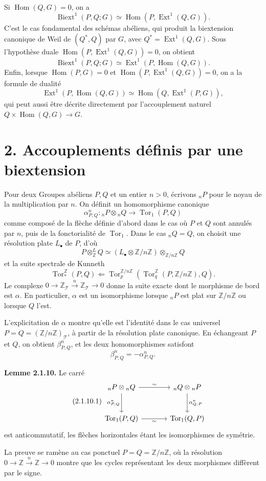 \documentclass[11pt]{article}
\providecommand{\Hom}{\operatorname{Hom}}
\providecommand{\Ext}{\operatorname{Ext}}
\providecommand{\Biext}{\operatorname{Biext}}
\providecommand{\Ext}{\operatorname{Ext}}
\providecommand{\Torop}{\operatorname{Tor}}
\providecommand{\cT}{\mathcal T}
\begin{document}
Si \(\Hom(Q,G)=0\), on a
\[
        \Biext^1(P,Q;G)\simeq\Hom(P,\Ext^1(Q,G)).
\]
C'est le cas fondamental des schémas abéliens, qui produit la biextension canonique de Weil de \((Q^*,Q)\) par \(G\), avec \(Q^*=\Ext^1(Q,G)\).  Sous l'hypothèse duale \(\Hom(P,\Ext^1(Q,G))=0\), on obtient
\[
        \Biext^1(P,Q;G)\simeq \Ext^1(P,\Hom(Q,G)).
\]
Enfin, lorsque \(\Hom(P,G)=0\) et \(\Hom(P,\Ext^1(Q,G))=0\), on a la formule de dualité
\[
        \Ext^1(P,\Hom(Q,G))\simeq\Hom(Q,\Ext^1(P,G)),
\]
qui peut aussi être décrite directement par l'accouplement naturel \(Q\times\Hom(Q,G)\to G\).

\section*{2. Accouplements définis par une biextension}

Pour deux Groupes abéliens \(P,Q\) et un entier \(n>0\), écrivons \({}_nP\) pour le noyau de la multiplication par \(n\).  On définit un homomorphisme canonique
\[
        \alpha^n_{P,Q}:{}_nP\otimes{}_nQ\to\Torop_1(P,Q)
\]
comme composé de la flèche définie d'abord dans le cas où \(P\) et \(Q\) sont annulés par \(n\), puis de la fonctorialité de \(\Torop_1\).  Dans le cas \({}_nQ=Q\), on choisit une résolution plate \(L_\bullet\) de \(P\), d'où
\[
        P\otimes^L_{\mathbb Z}Q\simeq
        (L_\bullet\otimes\mathbb Z/n\mathbb Z)\otimes_{\mathbb Z/n\mathbb Z}Q
\]
et la suite spectrale de Kunneth
\[
        \Torop_*^{\mathbb Z}(P,Q)
        \Longleftarrow
        \Torop_p^{\mathbb Z/n\mathbb Z}(\Torop_q^{\mathbb Z}(P,\mathbb Z/n\mathbb Z),Q).
\]
Le complexe \(0\to\mathbb Z_\cT\xrightarrow{n}\mathbb Z_\cT\to0\) donne la suite exacte dont le morphisme de bord est \(\alpha\).  En particulier, \(\alpha\) est un isomorphisme lorsque \({}_nP\) est plat sur \(\mathbb Z/n\mathbb Z\) ou lorsque \(Q\) l'est.

L'explicitation de \(\alpha\) montre qu'elle est l'identité dans le cas universel \(P=Q=(\mathbb Z/n\mathbb Z)_\cT\), à partir de la résolution plate canonique.  En échangeant \(P\) et \(Q\), on obtient \(\beta^n_{P,Q}\), et les deux homomorphismes satisfont
\[
        \beta^n_{P,Q}=-\alpha^n_{P,Q}.
\]

\textbf{Lemme 2.1.10.}  Le carré
\begin{equation}\tag{2.1.10.1}
\begin{tikzcd}[column sep=large,row sep=large]
{}_nP\otimes{}_nQ \arrow[r,"\sim"] \arrow[d,"\alpha^n_{P,Q}"']
  & {}_nQ\otimes{}_nP \arrow[d,"\alpha^n_{Q,P}"]\\
\Torop_1(P,Q) \arrow[r,"\sim"'] & \Torop_1(Q,P)
\end{tikzcd}
\end{equation}
est anticommutatif, les flèches horizontales étant les isomorphismes de symétrie.

La preuve se ramène au cas ponctuel \(P=Q=\mathbb Z/n\mathbb Z\), où la résolution \(0\to\mathbb Z\xrightarrow{n}\mathbb Z\to0\) montre que les cycles représentant les deux morphismes diffèrent par le signe.
\end{document}
